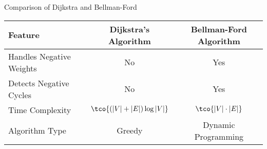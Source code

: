 \begin{properties}[]{Comparison of Dijkstra and Bellman-Ford}
    \begin{center}
        \begin{tabular}{lcc}
            \toprule
            \textbf{Feature}         & \textbf{Dijkstra's Algorithm} & \textbf{Bellman-Ford Algorithm} \\
            \midrule
            Handles Negative Weights & No                            & Yes                             \\
            Detects Negative Cycles  & No                            & Yes                             \\
            Time Complexity          & $\tco{(|V| + |E|) \log |V|}$  & $\tco{|V| \cdot |E|}$           \\
            Algorithm Type           & Greedy                        & Dynamic Programming             \\
            \bottomrule
        \end{tabular}
    \end{center}
\end{properties}
